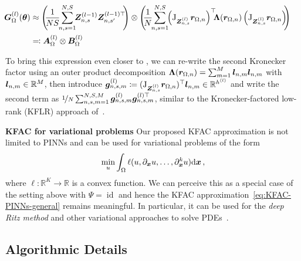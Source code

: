 \begin{tcolorbox}[colframe=kfac, title={KFAC for the GGN matrix of a general PDE operator},bottom=0mm,top=-2mm,middle=0mm]
  \begin{align}\label{eq:KFAC-PINNs-general}
    \begin{split}
      \hspace{-4ex}
      \mG_{\Omega}^{(l)}(\vtheta)
      &\approx
        \left(
        \!\!
        \frac{1}{N S}
        \!\!
        \sum_{n,s=1}^{N,S}
        \!\!
        \mZ^{(l-1)}_{n,s} \mZ^{(l-1)\top}_{n,s'}
        \!\!
        \right)
        \otimes
        \left(
        \!\!
        \frac{1}{N}
        \!\!
        \sum_{n,s=1}^{N,S}
        \!\!
        \left(\jac_{\mZ^{(l)}_{n,s}} \vr_{\Omega,n} \right)^{\top}
        \!\!\!\mLambda(\vr_{\Omega,n})
        \left(
        \jac_{\mZ^{(l)}_{n,s}} \vr_{\Omega,n}
        \right)
        \!\!
        \right)
        \!\!
      \\
      &\eqqcolon
        \mA_{\Omega}^{(l)} \otimes \mB_{\Omega}^{(l)}
    \end{split}
  \end{align}
\end{tcolorbox}
To bring this expression even closer to , we can re-write the second Kronecker factor using an outer product decomposition ${\bm{\Lambda}}({\bm{r}}_{\Omega,n}) = \sum_{m=1}^M {\bm{l}}_{n,m} {\bm{l}}_{n,m}$ with ${\bm{l}}_{n,m} \in {\mathbb{R}}^M$, then introduce ${\bm{g}}^{(l)}_{n,s,m} \coloneqq (\mathrm{J}_{{\bm{Z}}^{(l)}_{n,s}} {\bm{r}}_{\Omega,n})^{\top} {\bm{l}}_{n,m} \in {\mathbb{R}}^{h^{(l)}}$ and write the second term as $\nicefrac{1}{N} \sum_{n,s,m=1}^{N,S,M} {\bm{g}}^{(l)}_{n,s,m} {\bm{g}}^{(l)\top}_{n,s,m}$, similar to the Kronecker-factored low-rank (KFLR) approach of~\citet{botev2017practical}.

\textbf{KFAC for variational problems}
Our proposed KFAC approximation is not limited to PINNs and can be used for variational problems of the form
\begin{align}
  \min_u \int_\Omega \ell(u, \partial_{{\bm{x}}} u, \dots, \partial^k_{{\bm{x}}} u) \mathrm{d}{\bm{x}}\,,
\end{align}
where $\ell\colon\mathbb R^K\to\mathbb R$ is a convex function.
We can perceive this as a special case of the setting above with $\Psi = \operatorname{id}$ and hence the KFAC approximation~\eqref{eq:KFAC-PINNs-general} remains meaningful.
In particular, it can be used for the \emph{deep Ritz method} and other variational approaches to solve PDEs~\citep{yu2018deep}.

\subsection{Algorithmic Details}

